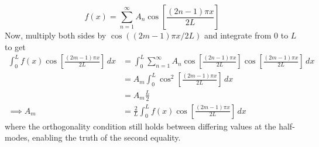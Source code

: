 \documentclass[a4paper]{article}
\begin{document}
\[
	f \!\left( x \right) = \sum^{\infty}_{n=1} A_{n}\cos\!\left[\frac{\!\left( 2n - 1 \right)\pi x}{2L}\right] 
\]
Now, multiply both sides by \( \cos\!\left(\!\left( 2m - 1 \right)\pi x / 2L \right) \) and integrate from \( 0 \) to \( L \) to get
\begin{align*}
	\int^{L}_{0} f \!\left( x \right)\cos\!\left[\frac{\!\left( 2m - 1 \right)\pi x}{2L}\right] \, dx & = \int^{L}_{0} \sum^{\infty}_{n=1} A_{n}\cos\!\left[\frac{\!\left( 2n - 1 \right)\pi x}{2L}\right]\cos\!\left[\frac{\!\left( 2m - 1 \right)\pi x}{2L}\right] \, dx \\
													  & = A_{m}\int^{L}_{0} \cos^{2}\!\left[\frac{\!\left( 2m - 1 \right)\pi x}{2L}\right] \, dx \\
													  & = A_{m}\frac{L}{2} \\
	\implies A_{m} & = \frac{2}{L}\int^{L}_{0} f \!\left( x \right)\cos\!\left[\frac{\!\left( 2m - 1 \right)\pi x}{2L}\right] \, dx 
\end{align*}
where the orthogonality condition still holds between differing values at the half-modes, enabling the truth of the second equality.

\vspace{12pt}

\end{document}
